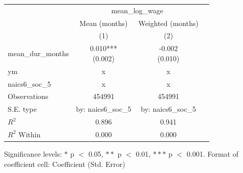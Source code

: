 \renewcommand\cellalign{t}
\begin{threeparttable}
\begin{tabular}{lccc}
\toprule
 & \multicolumn{2}{c}{mean_log_wage} \\
\cmidrule(lr){2-3} 
 & Mean (months) & Weighted (months) \\
 & (1) & (2) \\
\midrule
\addlinespace
mean_dur_months & \makecell{0.010*** \\ (0.002)} & \makecell{-0.002 \\ (0.010)} \\
\midrule
\addlinespace
ym & x & x \\
naics6_soc_5 & x & x \\
\midrule
\addlinespace
Observations & 454991 & 454991 \\
S.E. type & by: naics6_soc_5 & by: naics6_soc_5 \\
$R^2$ & 0.896 & 0.941 \\
$R^2$ Within & 0.000 & 0.000 \\
\bottomrule
\end{tabular}
\footnotesize Significance levels: $*$ p $<$ 0.05, $**$ p $<$ 0.01, $***$ p $<$ 0.001. Format of coefficient cell: Coefficient 
 (Std. Error)
\end{threeparttable}
